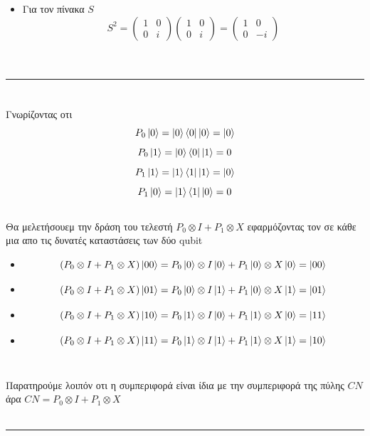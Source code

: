 \documentclass[12pt]{article}
\begin{document}
\begin{itemize}
    \item Για τον πίνακα $S$ $$S^2 =  \begin{pmatrix*}
        1 &0\\
        0 &i
    \end{pmatrix*} \begin{pmatrix*}
        1 &0\\
        0 &i
    \end{pmatrix*} =  \begin{pmatrix*}
        1 &0\\
        0 &-i
    \end{pmatrix*}$$\\ \\

\end{itemize}
\rule{\textwidth}{.5pt}

\section*{{}} 
Γνωρίζοντας οτι 
$$P_0\ket{0} = \ket{0}\bra{0}\ket{0} = \ket{0}$$
$$P_0\ket{1} = \ket{0}\bra{0}\ket{1} =0$$
$$P_1\ket{1} = \ket{1}\bra{1}\ket{1} = \ket{0}$$
$$P_1\ket{0} = \ket{1}\bra{1}\ket{0} =0$$ \\ 
Θα μελετήσουεμ την δράση του τελεστή $P_0\otimes I + P_1\otimes X$  εφαρμόζοντας τον σε κάθε μια απο τις δυνατές καταστάσεις των δύο \textlatin{qubit}
\begin{itemize}
    \item $$(P_0\otimes I + P_1\otimes X)\ket{00} = P_0\ket{0}\otimes I\ket{0} + P_1\ket{0}\otimes X\ket{0} = \ket{00}$$
    \item $$(P_0\otimes I + P_1\otimes X)\ket{01} = P_0\ket{0}\otimes I\ket{1} + P_1\ket{0}\otimes X\ket{1} = \ket{01}$$
    \item $$(P_0\otimes I + P_1\otimes X)\ket{10} = P_0\ket{1}\otimes I\ket{0} + P_1\ket{1}\otimes X\ket{0} = \ket{11}$$
    \item $$(P_0\otimes I + P_1\otimes X)\ket{11} = P_0\ket{1}\otimes I\ket{1} + P_1\ket{1}\otimes X\ket{1} = \ket{10}$$\\
\end{itemize}
Παρατηρούμε λοιπόν οτι η συμπεριφορά είναι ίδια με την συμπεριφορά της πύλης $CN$ άρα $CN = P_0\otimes I + P_1\otimes X$\\ \\
\rule{\textwidth}{.5pt}
\end{document}
